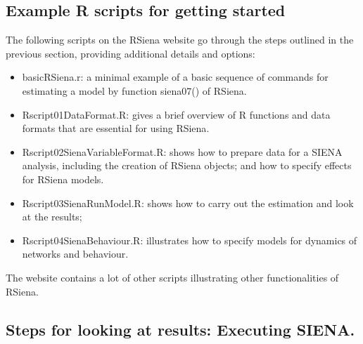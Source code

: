\documentclass[a4paper,fleqn,11pt]{article}
\newcommand{\+}{\, + \,}
\newcommand{\sfn}[1]{\textsf{#1}}
\newcommand{\R}{{\sf R }}
\newcommand{\rs}{{\sf RSiena}}
\newcommand{\RS}{{\sf RSiena }}
\newcommand{\SI}{{\sf SIENA }}
\newcommand{\si}{{\sf SIENA}}
\begin{document}
\subsection{Example \R scripts for getting started}
\label{R_scripts}
The following scripts on the \RS website go through the steps
outlined in the previous section, providing additional details and options: \\
\begin{itemize}
    \item \sfn{basicRSiena.r}: a minimal example of a basic sequence of commands
           for estimating a model by function \sfn{siena07()} of \rs.
	\item \sfn{Rscript01DataFormat.R}: gives a brief overview of \R functions
            and data formats that are essential for using \rs.
	\item \sfn{Rscript02SienaVariableFormat.R}: shows how to prepare data
            for a \SI analysis, including the creation of \RS objects;
            and how to specify effects for \RS models.
	\item \sfn{Rscript03SienaRunModel.R}:
           shows how to carry out the estimation and look at the results;
	\item \sfn{Rscript04SienaBehaviour.R}: illustrates
      how to specify models for dynamics of networks and behaviour.
\end{itemize}
The website contains a lot of other scripts illustrating other functionalities
of \rs.


\subsection{Steps for looking at results: Executing \si .}
\label{S_exec}
\end{document}
